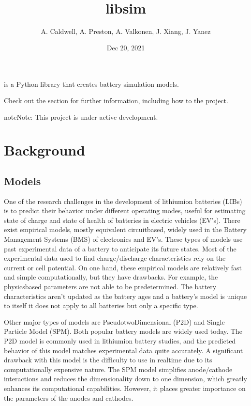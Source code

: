 \documentclass[letterpaper,10pt,english]{sphinxmanual}
\title{libsim}
\date{Dec 20, 2021}
\author{A.\@{} Caldwell, A.\@{} Preston, A.\@{} Valkonen, J.\@{} Xiang, J.\@{} Yanez}
\begin{document}
\pagestyle{empty}
\sphinxmaketitle
\pagestyle{plain}
\sphinxtableofcontents
\pagestyle{normal}
\label{\detokenize{index::doc}}


\sphinxAtStartPar
{} is a Python library that creates battery simulation models.

\sphinxAtStartPar
Check out the {\hyperref[\detokenize{usage::doc}]{}} section for further information, including how to {\hyperref[\detokenize{usage:installation}]{}} the project.

\begin{sphinxadmonition}{note}{Note:}
\sphinxAtStartPar
This project is under active development.
\end{sphinxadmonition}


\chapter{Background}
\label{\detokenize{background:background}}\label{\detokenize{background::doc}}

\section{Models}
\label{\detokenize{background:models}}
\sphinxAtStartPar
One of the research challenges in the development of lithium\sphinxhyphen{}ion batteries
(LIBs) is to predict their behavior under different operating modes,
useful for estimating state of charge and state of health of batteries
in electric vehicles (EV’s). There exist empirical models, mostly equivalent
circuit\sphinxhyphen{}based, widely used in the Battery Management Systems (BMS) of
electronics and EV’s. These types of models use past experimental data of a
battery to anticipate its future states. Most of the experimental data used
to find charge/discharge characteristics rely on the current or cell
potential. On one hand, these empirical models are relatively fast and
simple computationally, but they have drawbacks. For example, the
physics\sphinxhyphen{}based parameters are not able to be predetermined. The battery
characteristics aren’t updated as the battery ages and a battery’s model
is unique to itself \sphinxhyphen{} it does not apply to all batteries but only a specific
type.

\sphinxAtStartPar
Other major types of models are Pseudo\sphinxhyphen{}two\sphinxhyphen{}Dimensional (P2D) and Single
Particle Model (SPM). Both popular battery models are widely used today.
The P2D model is commonly used in lithium\sphinxhyphen{}ion battery studies, and the
predicted behavior of this model matches experimental data quite accurately.
A significant drawback with this model is the difficulty to use in real\sphinxhyphen{}time
due to its computationally expensive nature. The SPM model simplifies
anode/cathode interactions and reduces the dimensionality down to one
dimension, which greatly enhances its computational capabilities. However,
it places greater importance on the parameters of the anodes and cathodes.
\end{document}
